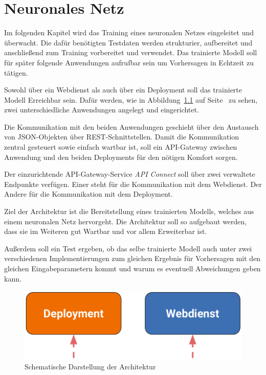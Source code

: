 \chapter{Neuronales Netz}
\label{ch:neuronalesNetz}
Im folgenden Kapitel wird das Training eines neuronalen Netzes eingeleitet und überwacht. Die dafür benötigten Testdaten
werden strukturier, aufbereitet und anschließend zum Training vorbereitet und verwendet. Das trainierte Modell soll für
später folgende Anwendungen aufrufbar sein um Vorhersagen in Echtzeit zu tätigen.

Sowohl über ein Webdienst als auch über ein Deployment soll das trainierte Modell Erreichbar sein. Dafür werden, wie in
Abbildung~\ref{fig:schematische_architektur} auf Seite~\pageref{fig:schematische_architektur} zu sehen, zwei
unterschiedliche Anwendungen angelegt und eingerichtet.

Die Kommunikation mit den beiden Anwendungen geschieht über den Austausch von JSON-Objekten über REST-Schnittstellen.
Damit die Kommunikation zentral gesteuert sowie einfach wartbar ist, soll ein API-Gateway zwischen Anwendung und den
beiden Deployments für den nötigen Komfort sorgen.

Der einzurichtende API-Gateway-Service \textit{API Connect} soll über zwei verwaltete Endpunkte verfügen. Einer steht
für die Kommunikation mit dem Webdienst. Der Andere für die Kommunikation mit dem Deployment.

Ziel der Architektur ist die Bereitstellung eines trainierten Modells, welches aus einem neuronalen Netz hervorgeht. Die
Architektur soll so aufgebaut werden, dass sie im Weiteren gut Wartbar und vor allem Erweiterbar ist.

Außerdem soll ein Test ergeben, ob das selbe trainierte Modell auch unter zwei verschiedenen Implementierungen zum
gleichen Ergebnis für Vorhersagen mit den gleichen Eingabeparametern kommt und warum es eventuell Abweichungen geben
kann.\\

\begin{figure}[h]
    \centering
    \includegraphics[scale=0.5]{images/kapitel_3/architektur_schematisch.pdf}
    \caption{Schematische Darstellung der Architektur}
    \label{fig:schematische_architektur}
\end{figure}